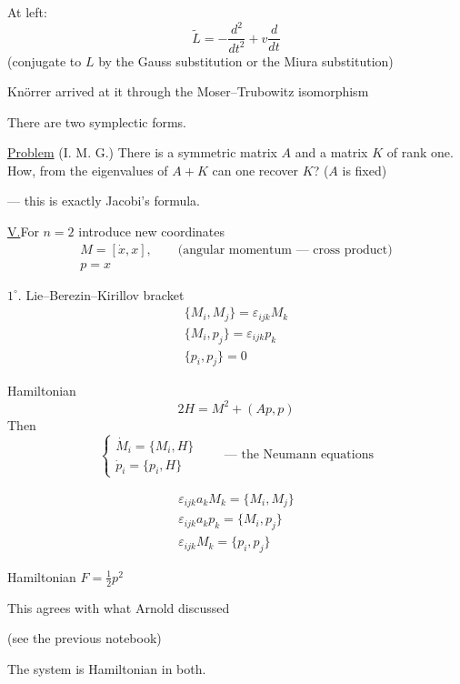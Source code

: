 
At left:
\begin{equation*}
\widetilde L=-\frac{d^2}{dt^2}+v\frac{d}{dt}
\tag{5}
\end{equation*}
(conjugate to \(L\) by the Gauss substitution or the Miura substitution)

Knörrer arrived at it through the Moser--Trubowitz isomorphism


There are two symplectic forms.

\uline{Problem} (I. M. G.) There is a symmetric matrix \(A\) and a matrix \(K\) of rank one.
How, from the eigenvalues of \(A+K\) can one recover \(K\)? (\(A\) is fixed)

--- this is exactly Jacobi's formula.

\uline{V.}\quad For \(n=2\) introduce new coordinates
\begin{gather*}
M=[\dot x,x],\qquad\text{(angular momentum --- cross product)}\\
p=x
\end{gather*}

\(1^{\circ}\). Lie--Berezin--Kirillov bracket
\begin{gather*}
\{M_i,M_j\}=\varepsilon_{ijk}M_k\\
\{M_i,p_j\}=\varepsilon_{ijk}p_k\\
\{p_i,p_j\}=0
\end{gather*}

Hamiltonian
\[
2H=M^2+(Ap,p)
\]
Then
\[
\begin{cases}
\dot M_i=\{M_i,H\}\\
\dot p_i=\{p_i,H\}
\end{cases}
\qquad\text{--- the Neumann equations}
\]

\begin{gather*}
\varepsilon_{ijk}a_kM_k=\{M_i,M_j\}\\
\varepsilon_{ijk}a_kp_k=\{M_i,p_j\}\\
\varepsilon_{ijk}M_k=\{p_i,p_j\}
\end{gather*}

Hamiltonian \(F=\frac12p^2\)

\quad This agrees with what Arnold discussed

(see the previous notebook)

The system is Hamiltonian in both.


